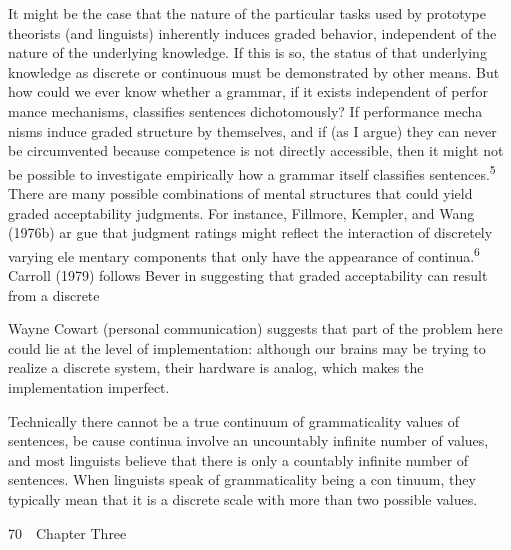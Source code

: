 \begin{styleTextbody}
It might be the case that the nature of the particular tasks used by prototype theorists (and linguists) inherently induces graded behavior, independent of the nature of the underlying knowledge. If this is so, the status of that underlying knowledge as discrete or continuous must be demonstrated by other means. But how could we ever know whether a grammar, if it exists independent of perfor\- mance mechanisms, classifies sentences dichotomously? If performance mecha\- nisms induce graded structure by themselves, and if (as I argue) they can never be circumvented because competence is not directly accessible, then it might not be possible to investigate empirically how a grammar itself classifies sentences.\textsuperscript{5}\textsuperscript{ }There are many possible combinations of mental structures that could yield graded acceptability judgments. For instance, Fillmore, Kempler, and Wang (1976b) ar\- gue that judgment ratings might reflect the interaction of discretely varying ele\- mentary components that only have the appearance of continua.\textsuperscript{6}\textsuperscript{ }Carroll (1979) follows Bever in suggesting that graded acceptability can result from a discrete
\end{styleTextbody}


\setcounter{listWWNumlvleveli}{2}
\begin{listWWNumlvleveli}
\item 
\setcounter{listWWNumlvlevelii}{1}
\begin{listWWNumlvlevelii}
\item 
\setcounter{listWWNumlvleveliii}{0}
\begin{listWWNumlvleveliii}
\item 
\begin{styleStandard}
Wayne Cowart (personal communication) suggests that part of the problem here could lie at the level of implementation: although our brains may be trying to realize a discrete system, their hardware is analog, which makes the implementation imperfect.
\end{styleStandard}


\item 
\begin{styleStandard}
Technically there cannot be a true continuum of grammaticality values of sentences, be\- cause continua involve an uncountably infinite number of values, and most linguists believe that there is only a countably infinite number of sentences. When linguists speak of grammaticality being a con\- tinuum, they typically mean that it is a discrete scale with more than two possible values.
\end{styleStandard}


\end{listWWNumlvleveliii}
\end{listWWNumlvlevelii}
\end{listWWNumlvleveli}
\clearpage\setcounter{page}{1}\begin{styleStandard}
70\ \ Chapter Three
\end{styleStandard}


